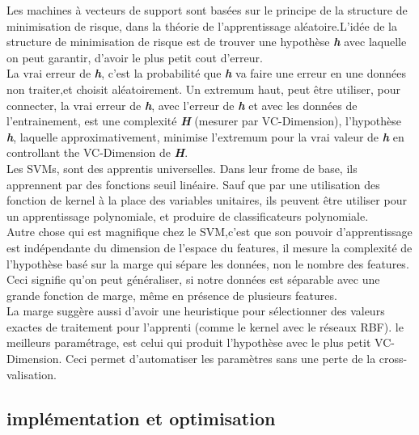 Les machines à vecteurs de support sont basées sur le principe de la structure de minimisation de risque, dans la théorie de l'apprentissage aléatoire.L'idée de la structure de minimisation de risque est de trouver une hypothèse \textbf{\textit{h}} avec laquelle on peut garantir, d'avoir le plus petit cout d'erreur. \\La vrai erreur de \textbf{\textit{h}}, c'est la probabilité que \textbf{\textit{h}} va faire une erreur en une données non traiter,et choisit aléatoirement. Un extremum haut, peut être utiliser, pour connecter, la vrai erreur de \textbf{\textit{h}}, avec l'erreur de \textbf{\textit{h}} et avec les données de  l'entrainement, est une complexité \textbf{\textit{H}} (mesurer par VC-Dimension), l'hypothèse \textbf{\textit{h}}, laquelle approximativement, minimise l'extremum pour la vrai valeur de \textbf{\textit{h}} en controllant the VC-Dimension de \textbf{\textit{H}}. \\[0.2cm]
Les SVMs, sont des apprentis universelles. Dans leur frome de base, ils apprennent par  des fonctions seuil linéaire. Sauf que par une utilisation des fonction de kernel à la place des variables unitaires, ils peuvent être utiliser pour un apprentissage polynomiale, et produire de classificateurs polynomiale.\\[0.2cm]
Autre chose qui est magnifique chez le SVM,c'est que son pouvoir d'apprentissage est indépendante du dimension de l'espace du features, il mesure la complexité de l'hypothèse basé sur la marge qui sépare les données, non le nombre des features. Ceci signifie qu'on peut généraliser, si notre données est séparable avec une grande fonction de marge, même en présence de plusieurs features.\\[0.2cm]
La marge suggère aussi d'avoir une heuristique pour sélectionner des valeurs exactes de traitement pour l'apprenti (comme le kernel avec le réseaux RBF). le meilleurs paramétrage, est celui qui produit l'hypothèse avec le plus petit VC-Dimension. Ceci permet d'automatiser les paramètres sans une perte de la cross-valisation.
\subsection{implémentation et optimisation}


